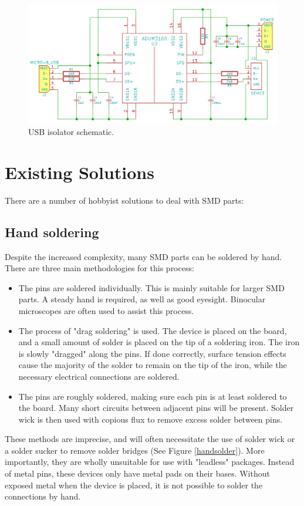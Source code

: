 \begin{figure}[ht!]
\centering
\includegraphics[width=120mm]{resources/isolatorschem.png}
\caption{USB isolator schematic.}
\label{usbisolatorschem}
\end{figure}

\section{Existing Solutions}
There are a number of hobbyist solutions to deal with SMD parts:

\subsection{Hand soldering}
Despite the increased complexity, many SMD parts can be soldered by hand. There are three main methodologies for this process:

\begin{itemize}
	\item	The pins are soldered individually. This is mainly suitable for larger SMD parts. A steady hand is required, as well as good eyesight.
			Binocular microscopes are often used to assist this process.
	\item	The process of "drag soldering" is used. The device is placed on the board, and a small amount of solder is placed on the tip of a soldering iron.
			The iron is slowly "dragged" along the pins. If done correctly, surface tension effects cause the majority of the solder to remain on the tip of the iron,
			while the necessary electrical connections are soldered.
	\item	The pins are roughly soldered, making sure each pin is at least soldered to the board. Many short circuits between adjacent pins will be present. Solder wick
			is then used with copious flux to remove excess solder between pins.
\end{itemize}

These methods are imprecise, and will often necessitate the use of solder wick or a solder sucker to remove solder bridges (See Figure \ref{handsolder}). More importantly, they are wholly unsuitable
for use with "leadless" packages. Instead of metal pins, these devices only have metal pads on their bases. Without exposed metal when the device is placed, it is not possible
to solder the connections by hand.

